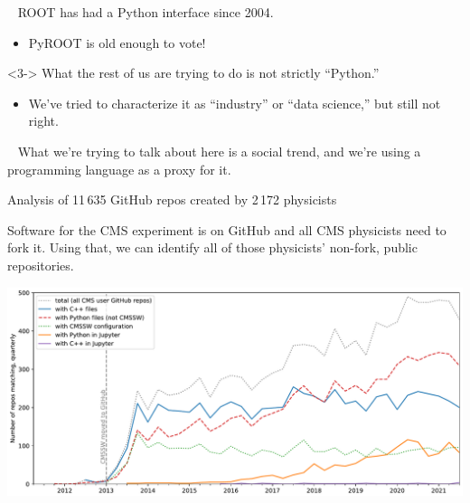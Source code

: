 \documentclass[aspectratio=169]{beamer}
\begin{document}
\begin{frame}{\mbox{ }}
\Large
\vspace{0.25 cm}
ROOT has had a Python interface since 2004.

\vspace{0.2 cm}
\begin{itemize}
\item<2-> PyROOT is old enough to vote!
\end{itemize}

\vspace{1.25 cm}
\begin{uncoverenv}<3->
What the rest of us are trying to do is not strictly ``Python.''
\vspace{0.2 cm}
\begin{itemize}
\item<4-> We've tried to characterize it as ``industry'' or ``data science,'' but still not right.
\end{itemize}
\end{uncoverenv}
\end{frame}

\begin{frame}{\mbox{ }}
\Large
What we're trying to talk about here is a social trend, and we're using a programming language as a proxy for it.
\end{frame}

\begin{frame}{Analysis of 11\,635 GitHub repos created by 2\,172 physicists}
\vspace{0.25 cm}

Software for the CMS experiment is on GitHub and all CMS physicists need to fork it. Using that, we can identify all of those physicists' non-fork, public repositories.

\vspace{0.2 cm}

\includegraphics[width=\linewidth]{PLOTS/gihub-language-fullstudy.pdf}
\end{frame}
\end{document}
